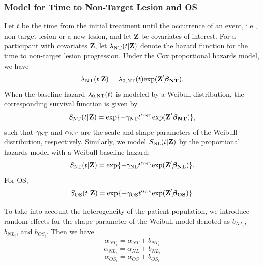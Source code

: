 \subsubsection{Model for Time to Non-Target Lesion and OS}
Let $t$ be the time from the initial treatment until the occurrence
of an event, i.e., non-target lesion or a new lesion, and let $\textbf{Z}$ be covariates of interest.
For a participant with covariates $\textbf{Z}$, let $\lambda_{\rm NT}(t|\textbf{Z})$
denote the hazard function for the time to non-target lesion progression. Under the Cox
proportional hazards model, we have
\begin{equation*}
\lambda_{\rm NT}(t|\textbf{Z})=\lambda_{0, \rm NT}(t)\mathrm{exp}(\textbf{Z}' \boldsymbol{\beta_{\rm NT}}). \label{cox}
\end{equation*}
When the baseline hazard $\lambda_{0, \rm NT}(t)$ is modeled by a Weibull
distribution, the corresponding survival function is given by
\begin{equation}
S_{\rm NT}(t|\textbf{Z})=\mathrm{exp}\{-\gamma_{\rm NT} t^{\alpha_{\rm NT}}
\mathrm{exp}(\textbf{Z}' \boldsymbol{\beta_{\rm NT}} )\},\label{SurvT}
\end{equation}
such that $\gamma_{\rm NT}$ and $\alpha_{\rm NT}$ are the scale and shape parameters
of the Weibull distribution, respectively. Similarly, we
model $S_{\rm NL}(t|\textbf{Z})$ by the proportional hazards model with a Weibull baseline hazard:
\begin{equation}
S_{\rm NL}(t|\textbf{Z})=\mathrm{exp}\{-\gamma_{\rm NL} t^{\alpha_{\rm NL}}
\mathrm{exp}(\textbf{Z}' \boldsymbol{\beta_{\rm NL}} )\}. \label{SurvE}
\end{equation}
For \ac{OS},
\begin{equation}
S_{\rm OS}(t|\textbf{Z})=\mathrm{exp}\{-\gamma_{\rm OS} t^{\alpha_{\rm OS}}
\mathrm{exp}(\textbf{Z}' \boldsymbol{\beta_{\rm OS}} )\}. \label{SurvOS}
\end{equation}

To take into account the heterogeneity of the patient population, we introduce random effects for the shape parameter of the Weibull model denoted as $b_{NT_i}$, $b_{NL_i}$, and $b_{OS_i}$. Then we have
$$\alpha_{NT_i}=\alpha_{NT}+b_{NT_i}$$
$$\alpha_{NL_i}=\alpha_{NL}+b_{NL_i}$$
$$\alpha_{OS_i}=\alpha_{OS}+b_{OS_i}$$

